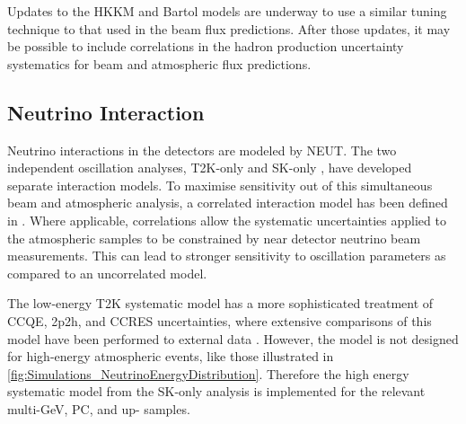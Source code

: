 Updates to the HKKM and Bartol models are underway \cite{Sato2022-ss} to use a similar tuning technique to that used in the beam flux predictions. After those updates, it may be possible to include correlations in the hadron production uncertainty systematics for beam and atmospheric flux predictions.

\subsection{Neutrino Interaction}
\label{sec:SelsAndSysts_Systs_Interaction}

Neutrino interactions in the detectors are modeled by NEUT. The two independent oscillation analyses, T2K-only \cite{t2k_tn_344} and SK-only \cite{Kamiokande_Collaboration2017-nf}, have developed separate interaction models. To maximise sensitivity out of this simultaneous beam and atmospheric analysis, a correlated interaction model has been defined in \cite{t2k_tn_422}. Where applicable, correlations allow the systematic uncertainties applied to the atmospheric samples to be constrained by near detector neutrino beam measurements. This can lead to stronger sensitivity to oscillation parameters as compared to an uncorrelated model.

The low-energy T2K systematic model has a more sophisticated treatment of CCQE, 2p2h, and CCRES uncertainties, where extensive comparisons of this model have been performed to external data \cite{t2k_tn_344}. However, the model is not designed for high-energy atmospheric events, like those illustrated in \autoref{fig:Simulations_NeutrinoEnergyDistribution}. Therefore the high energy systematic model from the SK-only analysis is implemented for the relevant multi-GeV, PC, and up-\quickmath{\mu} samples. 



